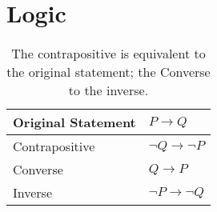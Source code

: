 \section{Logic}


\begin{table}[H]
    \centering
    \begin{tabular}{| l | l |}
        \hline
        Original Statement & $P \rightarrow Q$  \\ \hline
        Contrapositive & $\neg Q \rightarrow \neg P$  \\ \hline
        Converse & $Q \rightarrow P$  \\ \hline
        Inverse & $\neg P \rightarrow \neg Q$  \\ \hline
    \end{tabular}
    \caption{The contrapositive is equivalent to the original statement; the Converse to the inverse.}
\end{table}